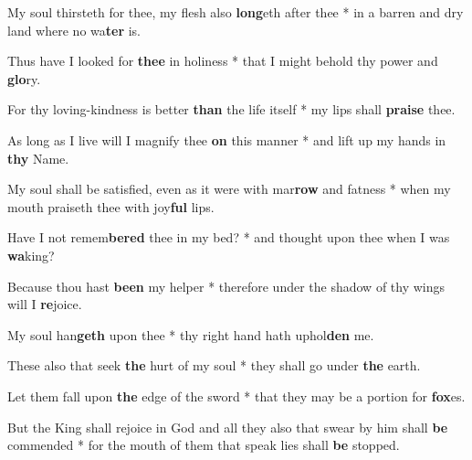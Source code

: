 \begin{multicols}{2}
	My soul thirsteth for thee, my flesh also \textbf{long}eth after thee * in a barren and dry land where no wa\textbf{ter} is.
	
	Thus have I looked for \textbf{thee} in holiness * that I might behold thy power and \textbf{glo}ry.
	
	For thy loving-kindness is better \textbf{than} the life itself * my lips shall \textbf{praise} thee.
	
	As long as I live will I magnify thee \textbf{on} this manner * and lift up my hands in \textbf{thy} Name.
	
	My soul shall be satisfied, even as it were with mar\textbf{row} and fatness * when my mouth praiseth thee with joy\textbf{ful} lips.
	
	Have I not remem\textbf{bered} thee in my bed? * and thought upon thee when I was \textbf{wa}king?
	
	Because thou hast \textbf{been} my helper * therefore under the shadow of thy wings will I \textbf{re}joice.
	
	My soul han\textbf{geth} upon thee * thy right hand hath uphol\textbf{den} me.
	
	These also that seek \textbf{the} hurt of my soul * they shall go under \textbf{the} earth.
	
	Let them fall upon \textbf{the} edge of the sword * that they may be a portion for \textbf{fox}es.
	
	But the King shall rejoice in God and all they also that swear by him shall \textbf{be} commended * for the mouth of them that speak lies shall \textbf{be} stopped.
\end{multicols}